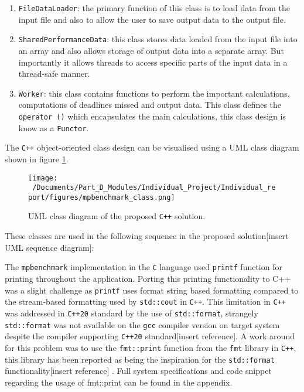 \begin{enumerate}
	\item \texttt{FileDataLoader}: the primary function of this class is to load data from the input file and also to allow the user to save output data to the output file.
	\item \texttt{SharedPerformanceData}: this class stores data loaded from the input file into an array and also allows storage of output data into a separate array. But importantly it allows threads to access specific parts of the input data in a thread-safe manner. 
	\item \texttt{Worker}: this class contains functions to perform the important calculations, computations of deadlines missed and output data. This class defines the \texttt{operator ()} which encapsulates the main calculations, this class design is know as a \texttt{Functor}.
\end{enumerate}

The \texttt{C++} object-oriented class design can be visualised using a UML class diagram shown in figure \ref*{fig:mpbenchmark_UML_diagram}.

\begin{figure}[h] %
	\centering
	\texttt{[image: ~/Documents/Part\_D\_Modules/Individual\_Project/Individual\_report/figures/mpbenchmark\_class.png]} %
	\caption{UML class diagram of the proposed \texttt{C++} solution.}
	\label{fig:mpbenchmark_UML_diagram} %
\end{figure}

These classes are used in the following sequence in the proposed solution[insert UML sequence diagram]:

The \texttt{mpbenchmark} implementation in the \texttt{C} language used \texttt{printf} function for printing throughout the application. Porting this printing functionality to C++ was a slight challenge as \texttt{printf} uses format string based formatting compared to the stream-based formatting used by \texttt{std::cout} in \texttt{C++}. This limitation in \texttt{C++} was addressed in \texttt{C++20} standard by the use of \texttt{std::format}, strangely \texttt{std::format} was not available on the \texttt{gcc} compiler version on target system despite the compiler supporting \texttt{C++20} standard[insert reference]. A work around for this problem was to use the \texttt{fmt::print} function from the \texttt{fmt} library in \texttt{C++}, this library has been reported as being the inspiration for the \texttt{std::format} functionality[insert reference] . Full system specifications and code snippet regarding the usage of fmt::print can be found in the appendix. 

